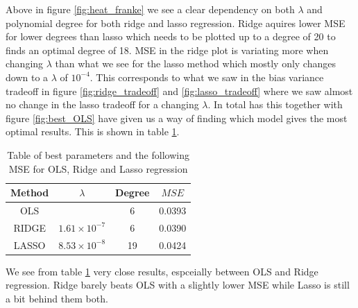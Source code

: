 \documentclass[12pt]{article}
\begin{document}
Above in figure \ref{fig:heat_franke} we see a clear dependency on both $\lambda$ and polynomial degree for both ridge and lasso regression. Ridge aquires lower MSE for lower degrees than lasso which needs to be plotted up to a degree of 20 to finds an optimal degree of 18. MSE in the ridge plot is variating more when changing $\lambda$ than what we see for the lasso method which mostly only changes down to a $\lambda$ of $10^{-4}$. This corresponds to what we saw in the bias variance tradeoff in figure \ref{fig:ridge_tradeoff} and \ref{fig:lasso_tradeoff} where we saw almost no change in the lasso tradeoff for a changing $\lambda$. In total has this together with figure \ref{fig:best_OLS} have given us a way of finding which model gives the most optimal results. This is shown in table \ref{tab:best_comp}.
\begin{table}[H]
  \centering
  \caption{Table of best parameters and the following MSE for OLS, Ridge and Lasso regression}
  \label{tab:best_comp}
  \begin{tabular}{|c||c|c|c|}
    \hline
    Method & $\lambda$ & Degree & $MSE$ \\
    \hline
    OLS &  & 6 & 0.0393 \\
    \hline
    RIDGE & $1.61\times10^{-7}$ & 6 & 0.0390 \\
    \hline
    LASSO & $8.53\times10^{-8}$ & 19 & 0.0424 \\
    \hline
  \end{tabular}
\end{table}
We see from table \ref{tab:best_comp} very close results, espceially between OLS and Ridge regression. Ridge barely beats OLS with a slightly lower MSE while Lasso is still a bit behind them both.
\end{document}
